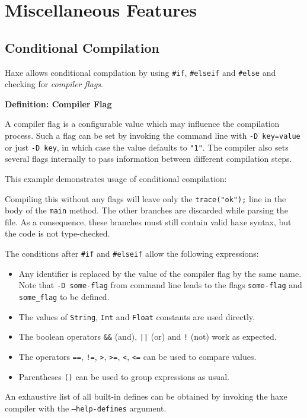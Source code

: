 \documentclass{article}
\newcommand{\type}[1]{\texttt{#1}}
\newcommand{\expr}[1]{\texttt{#1}}
\newenvironment{myshaded}
  {\def\FrameCommand{\fboxsep=\topsep\colorbox{bgcolor}}%
  \MakeFramed {\advance\hsize-\width \FrameRestore}}%
 {\endMakeFramed}
\newcommand{\define}[3][Definition]
	{\begin{myshaded}\noindent\textbf{#1: #2}\par\nobreak\noindent\ignorespaces#3\label{def:#2}\end{myshaded}}
\newcommand{\haxe}[2][]{%
}
\begin{document}
\section{Miscellaneous Features}
\label{Miscellaneous Features}

\subsection{Conditional Compilation}
\label{Conditional Compilation}

Haxe allows conditional compilation by using \expr{\#if}, \expr{\#elseif} and \expr{\#else} and checking for \emph{compiler flags}.

\define{Compiler Flag}{A compiler flag is a configurable value which may influence the compilation process. Such a flag can be set by invoking the command line with \expr{-D key=value} or just \expr{-D key}, in which case the value defaults to \expr{"1"}. The compiler also sets several flags internally to pass information between different compilation steps.}

This example demonstrates usage of conditional compilation:

\haxe{assets/ConditionalCompilation.hx}
Compiling this without any flags will leave only the \expr{trace("ok");} line in the body of the \expr{main} method. The other branches are discarded while parsing the file. As a consequence, these branches must still contain valid haxe syntax, but the code is not type-checked.

The conditions after \expr{\#if} and \expr{\#elseif} allow the following expressions:

\begin{itemize}
	\item Any identifier is replaced by the value of the compiler flag by the same name. Note that \expr{-D some-flag} from command line leads to the flags \expr{some-flag} and \expr{some\_flag} to be defined.
	\item The values of \type{String}, \type{Int} and \type{Float} constants are used directly.
	\item The boolean operators \expr{\&\&} (and), \expr{||} (or) and \expr{!} (not) work as expected.
	\item The operators \expr{==}, \expr{!=}, \expr{>}, \expr{>=}, \expr{<}, \expr{<=} can be used to compare values.
	\item Parentheses \expr{()} can be used to group expressions as usual.
\end{itemize}
An exhaustive list of all built-in defines can be obtained by invoking the haxe compiler with the \expr{--help-defines} argument.
\end{document}
